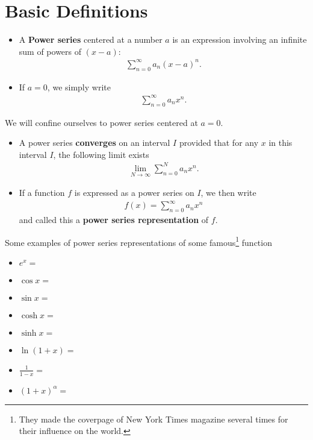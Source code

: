 \documentclass[12pt,a4paper]{article}
\newcommand{\ra}{\rightarrow}
\newcounter{example}[section]
\begin{document}
\vspace*{2cm}

\section{Basic Definitions}

\begin{itemize}
\item A \textbf{Power series} centered at a number $a$ is an expression involving an infinite sum of powers of $(x - a)$:
	\begin{align*}
	\sum_{n = 0}^\infty a_n (x - a)^n .
	\end{align*}
\item If $a =0$, we simply write
	\begin{align*}
	\sum_{n = 0}^\infty a_n x^n .
	\end{align*}
\end{itemize}

We will confine ourselves to power series centered at $a = 0$.

\newpage

\begin{itemize}
\item A power series \textbf{converges} on an interval $I$ provided that for any $x$ in this interval $I$, the following limit exists
	\begin{align*}
	\lim_{N \ra \infty} \sum_{n = 0}^N a_n x^n .
	\end{align*}
\item If a function $f$ is expressed as a power series on $I$, we then write
	\begin{align*}
	f(x) = \sum_{n= 0}^\infty a_n x^n
	\end{align*}
and called this a \textbf{power series representation} of $f$.
\end{itemize}

\vspace*{20pt}

Some examples of power series representations of some famous\footnote{They made the coverpage of New York Times magazine several times for their influence on the world.} function
	\begin{itemize}
	\item $e^x = $
	\vspace*{16pt}
	\item $\cos x = $
	\vspace*{16pt}	
	\item $\sin x = $
	\vspace*{16pt}	
	\item $\cosh x = $
	\vspace*{16pt}
	\item $\sinh x = $
	\vspace*{16pt}
	\item $\ln (1 + x) = $
	\vspace*{16pt}
	\item $\displaystyle\frac{1}{1 - x} = $
	\vspace*{16pt}
	\item $(1 + x)^\alpha = $
	\end{itemize}
	
\end{document}
